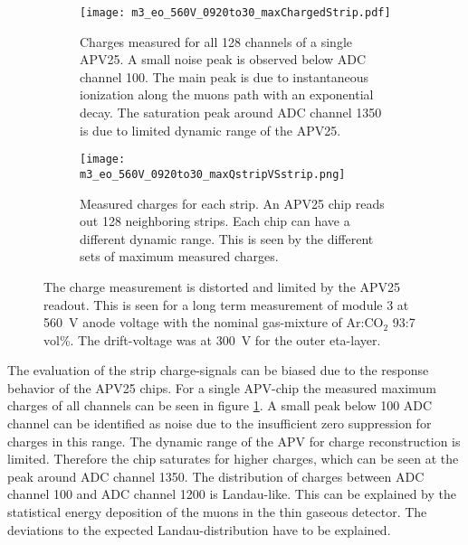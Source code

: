 \documentclass[
twoside,            %
BCOR1.4cm,          %
10pt,               %
headings=normal,    %
headsepline,        %
clearplainpage,		%
final,              %
div=14,
open=right,
bibliography=toc
]{scrreprt}
\begin{document}
\begin{figure}[!h]
	\begin{subfigure}[b]{0.48\textwidth}
		\centering
		\texttt{[image: m3\_eo\_560V\_0920to30\_maxChargedStrip.pdf]}
		\caption{
			Charges measured for all 128 channels of a single APV25.
			A small noise peak is observed below ADC channel 100.
			The main peak is due to instantaneous ionization along the muons path with an exponential decay.
			The saturation peak around ADC channel 1350 is due to limited dynamic range of the APV25.
		}
		\label{m3_eo_560V_0920to30_maxChargedStrip} 
	\end{subfigure}
	\hfill
	\begin{subfigure}[b]{0.48\textwidth}
		\centering
		\texttt{[image: m3\_eo\_560V\_0920to30\_maxQstripVSstrip.png]}
		\caption{
			Measured charges for each strip.
			An APV25 chip reads out 128 neighboring strips.
			Each chip can have a different dynamic range.
			This is seen by the different sets of maximum measured charges.
		}
		\label{m3_eo_560V_0920to30_maxQstripVSstrip} 
	\end{subfigure}
	\vspace{-2mm}
	\caption{
		The charge measurement is distorted and limited by the APV25 readout.
		This is seen for a long term measurement of module 3 at \SI{560}{V} anode voltage with the nominal gas-mixture of Ar:CO$_{2}$ 93:7 vol\%.
		The drift-voltage was at \SI{300}{V} for the outer eta-layer.
	}
\end{figure}

The evaluation of the strip charge-signals can be biased due to the response behavior of the APV25 chips.
For a single APV-chip the measured maximum charges of all channels can be seen in figure \ref{m3_eo_560V_0920to30_maxChargedStrip}.
A small peak below 100 ADC channel can be identified as noise due to the insufficient zero suppression for charges in this range.
The dynamic range of the APV for charge reconstruction is limited.
Therefore the chip saturates for higher charges, which can be seen at the peak around ADC channel 1350.
The distribution of charges between ADC channel 100 and ADC channel 1200 is Landau-like.
This can be explained by the statistical energy deposition of the muons in the thin gaseous detector.
The deviations to the expected Landau-distribution have to be explained.
\end{document}
